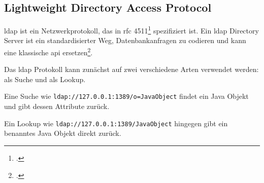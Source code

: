 
\subsection{Lightweight Directory Access Protocol}\label{subsec:ldap}
\gls{ldap} ist ein Netzwerkprotokoll, das in \gls{rfc} 4511\footcite{rfc4511} spezifiziert ist.
Ein \gls{ldap} Directory Server ist ein standardisierter Weg, Datenbankanfragen zu codieren und kann eine klassische \gls{api} ersetzen\footcite{ldapWebsite}.

Das \gls{ldap} Protokoll kann zunächst auf zwei verschiedene Arten verwendet werden: als Suche und als Lookup.

Eine Suche wie \verb|ldap://127.0.0.1:1389/o=JavaObject| findet ein Java Objekt und gibt dessen Attribute zurück.

Ein Lookup wie \verb|ldap://127.0.0.1:1389/JavaObject| hingegen gibt ein benanntes Java Objekt direkt zurück.
